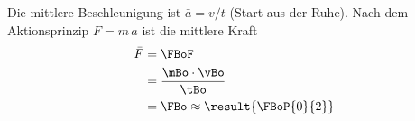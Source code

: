 Die mittlere Beschleunigung ist $\bar a = v/t$ (Start aus der Ruhe). Nach dem Aktionsprinzip $F = m\,a$ ist die mittlere Kraft
\begin{align}
 \bar F &= \FBoF \\
   &= \frac{\mBo\cdot\vBo}{\tBo} \\
   &= \FBo \approx \result{\FBoP{0}{2}}
\end{align}
